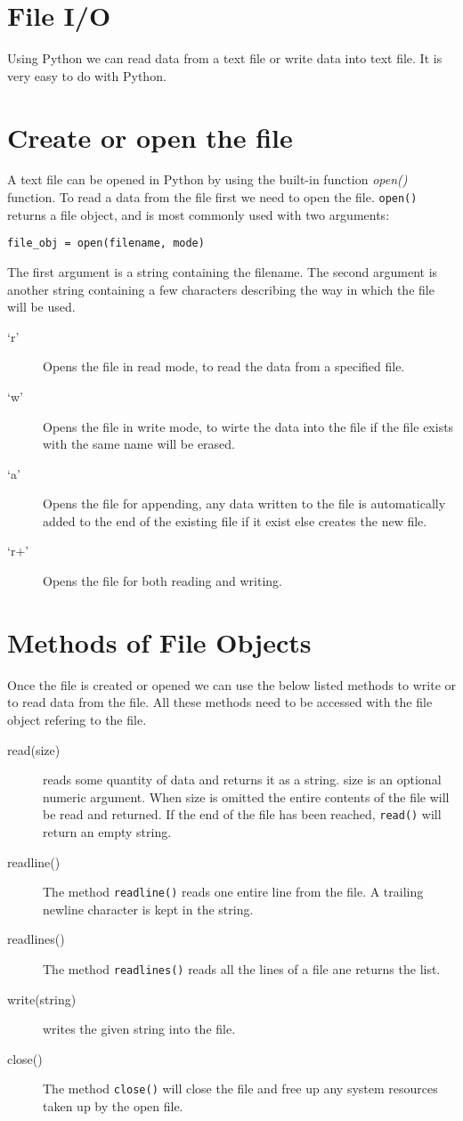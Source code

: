 \documentclass{book}
\begin{document}
\section*{File I/O}
Using Python we can read data from a text file or write data into text file.
It is very easy to do with Python.

\section*{Create or open the file}
A text file can be opened in Python by using the built-in function \emph{open()} function. To read a data from the file first we need to open the file.
\texttt{open()} returns a file object, and is most commonly used with two arguments:
\begin{verbatim}
file_obj = open(filename, mode)
\end{verbatim}
The first argument is a string containing the filename. The second argument is another string containing a few characters describing the way in which the file will be used.

\begin{description}
\item [`r'] Opens the file in read mode, to read the data from a specified file.
\item [`w'] Opens the file in write mode, to wirte the data into the file if the file exists with the same name will be erased.
\item [`a'] Opens the file for appending, any data written to the file is automatically added to the end of the existing file if it exist else creates the new file.
\item [`r+'] Opens the file for both reading and writing.
\end{description}

\section*{Methods of File Objects}
Once the file is created or opened we can use the below listed methods to write or to read data from the file. All these methods need to be accessed with the file object refering to the file.
\begin{description}
\item [read(size)] reads some quantity of data and returns it as a string. size is an optional numeric argument. When size is omitted the entire contents of the file will be read and returned. If the end of the file has been reached, \texttt{read()} will return an empty string. 
\item [readline()] The method \texttt{readline()} reads one entire line from the file. A trailing newline character is kept in the string.
\item [readlines()] The method \texttt{readlines()} reads all the lines of a file ane returns the list.
\item [write(string)] writes the given string into the file.
\item [close()] The method \texttt{close()} will close the file and free up any system resources taken up by the open file.
\end{description}
\end{document}
